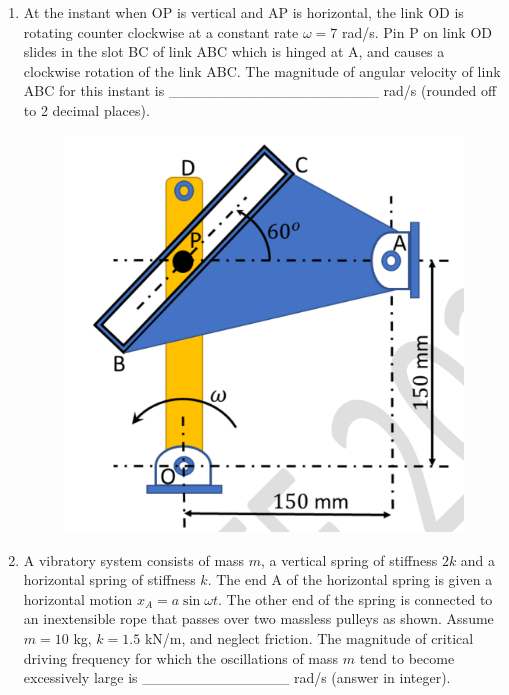 \documentclass[journal,11pt,onecolumn]{IEEEtran}
\begin{document}
\begin{enumerate}[resume]
    \item At the instant when OP is vertical and AP is horizontal, the link OD is rotating counter clockwise at a constant rate $\omega = 7$ rad/s. Pin P on link OD slides in the slot BC of link ABC which is hinged at A, and causes a clockwise rotation of the link ABC. The magnitude of angular velocity of link ABC for this instant is \_\_\_\_\_\_\_\_\_\_\_\_\_\_\_\_\_\_\_\_ rad/s (rounded off to 2 decimal places).

          \begin{figure}[H]
              \centering
              \includegraphics[scale=0.2]{q54}
              \caption{}
              \label{fig:q54}
          \end{figure}

    \item A vibratory system consists of mass $m$, a vertical spring of stiffness $2k$ and a horizontal spring of stiffness $k$. The end A of the horizontal spring is given a horizontal motion $x_A = a \sin \omega t$. The other end of the spring is connected to an inextensible rope that passes over two massless pulleys as shown. Assume $m = 10$ kg, $k=1.5$ kN/m, and neglect friction. The magnitude of critical driving frequency for which the oscillations of mass $m$ tend to become excessively large is \_\_\_\_\_\_\_\_\_\_\_\_\_\_ rad/s (answer in integer).


\end{enumerate}
\end{document}
